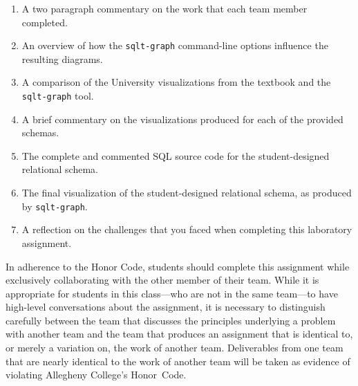 
\begin{enumerate}
  \setlength{\itemsep}{0pt}
  \item A two paragraph commentary on the work that each team member completed. 
  \item An overview of how the {\tt sqlt-graph} command-line options influence the resulting diagrams.
  \item A comparison of the University visualizations from the textbook and the {\tt sqlt-graph} tool.
  \item A brief commentary on the visualizations produced for each of the provided schemas.
  \item The complete and commented SQL source code for the student-designed relational schema.
  \item The final visualization of the student-designed relational schema, as produced by {\tt sqlt-graph}.
  \item A reflection on the challenges that you faced when completing this laboratory assignment.
\end{enumerate}


In adherence to the Honor Code, students should complete this assignment while exclusively collaborating with the
other member of their team. While it is appropriate for students in this class---who are not in the same team---to have
high-level conversations about the assignment, it is necessary to distinguish carefully between the team that discusses
the principles underlying a problem with another team and the team that produces an assignment that is identical to, or
merely a variation on, the work of another team.  Deliverables from one team that are nearly identical to the work of
another team will be taken as evidence of violating Allegheny College's \mbox{Honor Code}.



